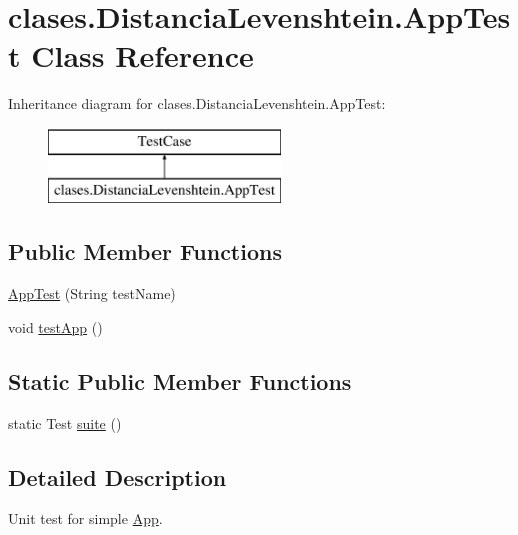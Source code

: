 \hypertarget{classclases_1_1_distancia_levenshtein_1_1_app_test}{}\section{clases.\+Distancia\+Levenshtein.\+App\+Test Class Reference}
\label{classclases_1_1_distancia_levenshtein_1_1_app_test}
Inheritance diagram for clases.\+Distancia\+Levenshtein.\+App\+Test\+:\begin{figure}[H]
\begin{center}
\leavevmode
\includegraphics[height=2.000000cm]{classclases_1_1_distancia_levenshtein_1_1_app_test}
\end{center}
\end{figure}
\subsection*{Public Member Functions}
\begin{DoxyCompactItemize}
\item 
\hyperlink{classclases_1_1_distancia_levenshtein_1_1_app_test_a811706b4c4e90cf825130e5603ec8484}{App\+Test} (String test\+Name)
\item 
void \hyperlink{classclases_1_1_distancia_levenshtein_1_1_app_test_afe16cffbe326f0e959c29805ac205c90}{test\+App} ()
\end{DoxyCompactItemize}
\subsection*{Static Public Member Functions}
\begin{DoxyCompactItemize}
\item 
static Test \hyperlink{classclases_1_1_distancia_levenshtein_1_1_app_test_a2f8dab2e95f46b42a3b0b1836b283f53}{suite} ()
\end{DoxyCompactItemize}


\subsection{Detailed Description}
Unit test for simple \hyperlink{classclases_1_1_distancia_levenshtein_1_1_app}{App}. 

